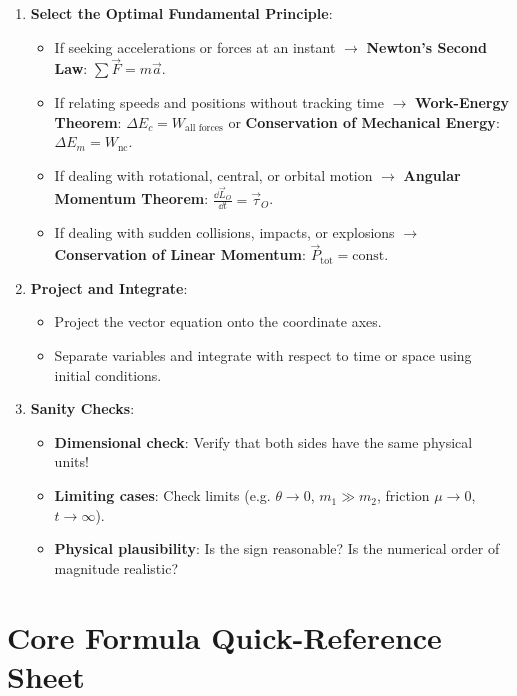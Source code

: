 \begin{enumerate}[leftmargin=1.8em,itemsep=4pt]
  \item \textbf{Select the Optimal Fundamental Principle}:
        \begin{itemize}[leftmargin=1.4em,itemsep=2pt]
          \item If seeking accelerations or forces at an instant $\rightarrow$ \textbf{Newton's Second Law}: $\sum\vec{F} = m\vec{a}$.
          \item If relating speeds and positions without tracking time $\rightarrow$ \textbf{Work-Energy Theorem}: $\Delta E_c = W_{\text{all forces}}$ or \textbf{Conservation of Mechanical Energy}: $\Delta E_m = W_{\text{nc}}$.
          \item If dealing with rotational, central, or orbital motion $\rightarrow$ \textbf{Angular Momentum Theorem}: $\frac{\dd\vec{L}_O}{\dd t} = \vec{\tau}_O$.
          \item If dealing with sudden collisions, impacts, or explosions $\rightarrow$ \textbf{Conservation of Linear Momentum}: $\vec{P}_{\text{tot}} = \text{const}$.
        \end{itemize}
  \item \textbf{Project and Integrate}:
        \begin{itemize}[leftmargin=1.4em,itemsep=2pt]
          \item Project the vector equation onto the coordinate axes.
          \item Separate variables and integrate with respect to time or space using initial conditions.
        \end{itemize}
  \item \textbf{Sanity Checks}:
        \begin{itemize}[leftmargin=1.4em,itemsep=2pt]
          \item \textbf{Dimensional check}: Verify that both sides have the same physical units!
          \item \textbf{Limiting cases}: Check limits (e.g. $\theta \to 0$, $m_1 \gg m_2$, friction $\mu \to 0$, $t \to \infty$).
          \item \textbf{Physical plausibility}: Is the sign reasonable? Is the numerical order of magnitude realistic?
        \end{itemize}
\end{enumerate}

\section{Core Formula Quick-Reference Sheet}

